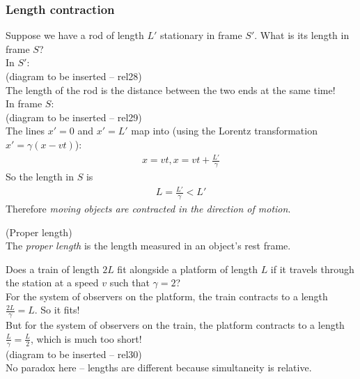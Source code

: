 \documentclass[a4paper]{article}
\begin{document}
\subsubsection{Length contraction}
Suppose we have a rod of length $L'$ stationary in frame $S'$. What is its length in frame $S$?\\
In $S'$:\\
(diagram to be inserted -- rel28)\\
The length of the rod is the distance between the two ends at the same time!\\
In frame $S$:\\
(diagram to be inserted -- rel29)\\
The lines $x'=0$ and $x'=L'$ map into (using the Lorentz transformation $x'=\gamma\left(x-vt\right)$):
\begin{equation*}
\begin{aligned}
x=vt, x=vt+\frac{L'}{\gamma}
\end{aligned}
\end{equation*}
So the length in $S$ is
\begin{equation*}
\begin{aligned}
L=\frac{L'}{\gamma} < L'
\end{aligned}
\end{equation*}
Therefore \emph{moving objects are contracted in the direction of motion}.

\begin{defi} (Proper length)\\
The \emph{proper length} is the length measured in an object's rest frame.
\end{defi}

Does a train of length $2L$ fit alongside a platform of length $L$ if it travels through the station at a speed $v$ such that $\gamma=2$?\\
For the system of observers on the platform, the train contracts to a length $\frac{2L}{\gamma} = L$. So it fits!\\
But for the system of observers on the train, the platform contracts to a length $\frac{L}{\gamma} = \frac{L}{2}$, which is much too short!\\
(diagram to be inserted -- rel30)\\
No paradox here -- lengths are different because simultaneity is relative.
\end{document}
